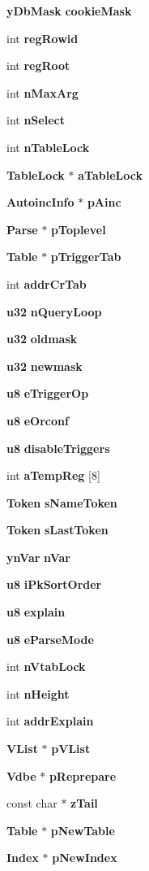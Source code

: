 \begin{DoxyCompactItemize}
\textbf{ y\+Db\+Mask} \textbf{ cookie\+Mask}
\item 
int \textbf{ reg\+Rowid}
\item 
int \textbf{ reg\+Root}
\item 
int \textbf{ n\+Max\+Arg}
\item 
int \textbf{ n\+Select}
\item 
int \textbf{ n\+Table\+Lock}
\item 
\textbf{ Table\+Lock} $\ast$ \textbf{ a\+Table\+Lock}
\item 
\textbf{ Autoinc\+Info} $\ast$ \textbf{ p\+Ainc}
\item 
\textbf{ Parse} $\ast$ \textbf{ p\+Toplevel}
\item 
\textbf{ Table} $\ast$ \textbf{ p\+Trigger\+Tab}
\item 
int \textbf{ addr\+Cr\+Tab}
\item 
\textbf{ u32} \textbf{ n\+Query\+Loop}
\item 
\textbf{ u32} \textbf{ oldmask}
\item 
\textbf{ u32} \textbf{ newmask}
\item 
\textbf{ u8} \textbf{ e\+Trigger\+Op}
\item 
\textbf{ u8} \textbf{ e\+Orconf}
\item 
\textbf{ u8} \textbf{ disable\+Triggers}
\item 
int \textbf{ a\+Temp\+Reg} [8]
\item 
\textbf{ Token} \textbf{ s\+Name\+Token}
\item 
\textbf{ Token} \textbf{ s\+Last\+Token}
\item 
\textbf{ yn\+Var} \textbf{ n\+Var}
\item 
\textbf{ u8} \textbf{ i\+Pk\+Sort\+Order}
\item 
\textbf{ u8} \textbf{ explain}
\item 
\textbf{ u8} \textbf{ e\+Parse\+Mode}
\item 
int \textbf{ n\+Vtab\+Lock}
\item 
int \textbf{ n\+Height}
\item 
int \textbf{ addr\+Explain}
\item 
\textbf{ V\+List} $\ast$ \textbf{ p\+V\+List}
\item 
\textbf{ Vdbe} $\ast$ \textbf{ p\+Reprepare}
\item 
const char $\ast$ \textbf{ z\+Tail}
\item 
\textbf{ Table} $\ast$ \textbf{ p\+New\+Table}
\item 
\textbf{ Index} $\ast$ \textbf{ p\+New\+Index}

\end{DoxyCompactItemize}
